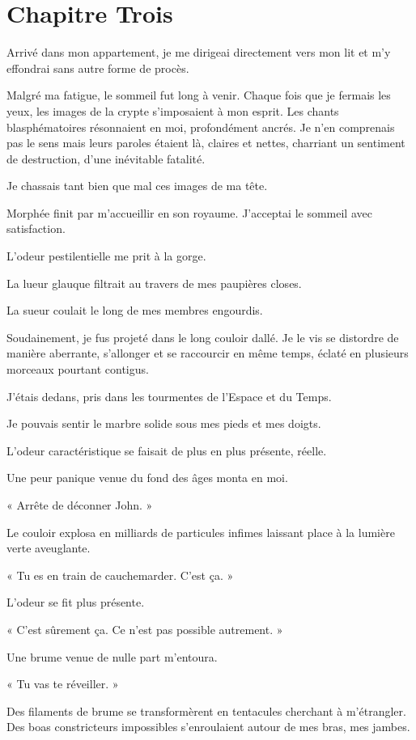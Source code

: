 \chapter[Chapitre Trois]{Chapitre Trois}
Arrivé dans mon appartement, je me dirigeai directement vers mon lit et m'y effondrai sans autre forme de procès.

Malgré ma fatigue, le sommeil fut long à venir. Chaque fois que je fermais les yeux, les images de la crypte 
s'imposaient à mon esprit. Les chants blasphématoires résonnaient en moi, profondément ancrés. Je n'en comprenais pas 
le sens mais leurs paroles étaient là, claires et nettes, charriant un sentiment de destruction, d'une inévitable 
fatalité.

Je chassais tant bien que mal ces images de ma tête.

Morphée finit par m'accueillir en son royaume. J'acceptai le sommeil avec satisfaction.

L'odeur pestilentielle me prit à la gorge.

La lueur glauque filtrait au travers de mes paupières closes. 

La sueur coulait le long de mes membres engourdis.

Soudainement, je fus projeté dans le long couloir dallé. Je le vis se distordre de manière aberrante, s'allonger et se 
raccourcir en même temps, éclaté en plusieurs morceaux pourtant contigus.

J'étais dedans, pris dans les tourmentes de l'Espace et du Temps.

Je pouvais sentir le marbre solide sous mes pieds et mes doigts.

L'odeur caractéristique se faisait de plus en plus présente, réelle.

Une peur panique venue du fond des âges monta en moi.

« Arrête de déconner John. »

Le couloir explosa en milliards de particules infimes laissant place à la lumière verte aveuglante.

« Tu es en train de cauchemarder. C'est ça. »

L'odeur se fit plus présente.

« C'est sûrement ça. Ce n'est pas possible autrement. »

Une brume venue de nulle part m'entoura.

« Tu vas te réveiller. » 

Des filaments de brume se transformèrent en tentacules cherchant à m'étrangler. Des boas constricteurs impossibles 
s'enroulaient autour de mes bras, mes jambes.

